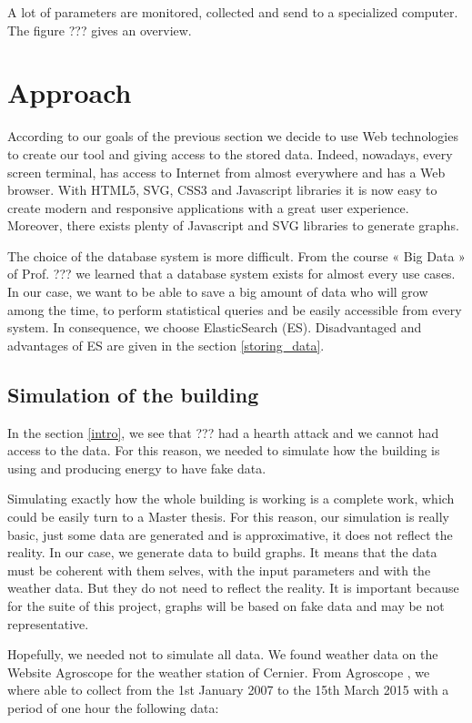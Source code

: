 \documentclass{acm_proc_article-sp}
\begin{document}
A lot of parameters are monitored, collected and send to a specialized computer. The figure ??? gives an overview.
\section{Approach}
\label{approach}
According to our goals of the previous section we decide to use Web technologies to create our tool and giving access to the stored data. Indeed, nowadays, every screen terminal, has access to Internet from almost everywhere and has a Web browser. With HTML5, SVG, CSS3 and Javascript libraries it is now easy to create modern and responsive applications with a great user experience. Moreover, there exists plenty of Javascript and SVG libraries to generate graphs.

The choice of the database system is more difficult. From the course « Big Data » of Prof. ??? we learned that a database system exists for almost every use cases. In our case, we want to be able to save a big amount of data who will grow among the time, to perform statistical queries and be easily accessible from every system. In consequence, we choose ElasticSearch (ES). Disadvantaged and advantages of ES are given in the section \ref{storing_data}.

\subsection{Simulation of the building}
In the section \ref{intro}, we see that ??? had a hearth attack and we cannot had access to the data. For this reason, we needed to simulate how the building is using and producing energy to have fake data.

Simulating exactly how the whole building is working is a complete work, which could be easily turn to a Master thesis. For this reason, our simulation is really basic, just some data are generated and is approximative, it does not reflect the reality. In our case, we generate data to build graphs. It means that the data must be coherent with them selves, with the input parameters and with the weather data. But they do not need to reflect the reality. It is important because for the suite of this project, graphs will be based on fake data and may be not representative.

Hopefully, we needed not to simulate all data. We found weather data on the Website Agroscope for the weather station of Cernier. From Agroscope \cite{agroscope}, we where able to collect from the 1st January 2007 to the 15th March 2015 with a period of one hour the following data:
\end{document}
